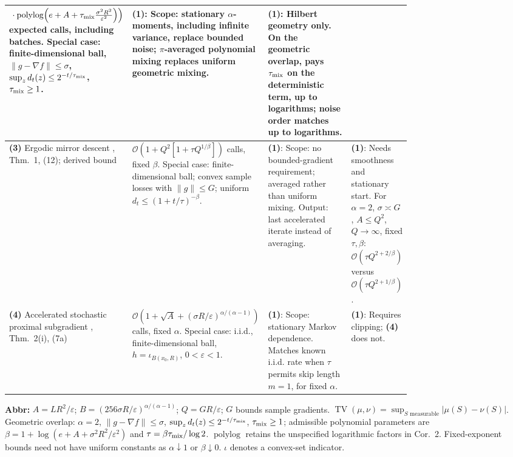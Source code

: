 \begin{table}[tp]
\begin{threeparttable}
\begin{tabularx}{\linewidth}{@{}>{\raggedright\arraybackslash}p{0.20\linewidth}>{\raggedright\arraybackslash}p{0.32\linewidth}>{\raggedright\arraybackslash}p{0.25\linewidth}>{\raggedright\arraybackslash}X@{}}
$\left.{}\cdot\operatorname{polylog}\!\left(e+A+\tau_{\rm mix}\frac{\sigma^2R^2}{\varepsilon^2}\right)\right)$ expected calls, including batches.
Special case: finite-dimensional ball, $\|g-\nabla f\|\le\sigma$, $\sup_z d_t(z)\le2^{-t/\tau_{\rm mix}}$, $\tau_{\rm mix}\ge1$.
& \textbf{(1)}: Scope: stationary $\alpha$-moments, including infinite variance, replace bounded noise; $\pi$-averaged polynomial mixing replaces uniform geometric mixing.
& \textbf{(1)}: Hilbert geometry only. On the geometric overlap, pays $\tau_{\rm mix}$ on the deterministic term, up to logarithms; noise order matches up to logarithms. \\
\midrule
\textbf{(3)} Ergodic mirror descent \citep{htmDuchi2012v3}, Thm.~1, (12); derived bound
& $\mathcal{O}\!\left(1+Q^2[1+\tau Q^{1/\beta}]\right)$ calls, fixed $\beta$.
Special case: finite-dimensional ball; convex sample losses with $\|g\|\le G$; uniform $d_t\le(1+t/\tau)^{-\beta}$.
& \textbf{(1)}: Scope: no bounded-gradient requirement; averaged rather than uniform mixing. Output: last accelerated iterate instead of averaging.
& \textbf{(1)}: Needs smoothness and stationary start. For $\alpha=2$, $\sigma\asymp G$, $A\le Q^2$, $Q\to\infty$, fixed $\tau,\beta$: $\mathcal{O}(\tau Q^{2+2/\beta})$ versus $\mathcal{O}(\tau Q^{2+1/\beta})$. \\
\midrule
\textbf{(4)} Accelerated stochastic proximal subgradient \citep{htmHeLiLu2026v2}, Thm.~2(i), (7a)
& $\mathcal{O}\!\left(1+\sqrt A+(\sigma R/\varepsilon)^{\alpha/(\alpha-1)}\right)$ calls, fixed $\alpha$.
Special case: i.i.d., finite-dimensional ball, $h=\iota_{B(x_0,R)}$, $0<\varepsilon<1$.
& \textbf{(1)}: Scope: stationary Markov dependence. Matches known i.i.d. rate when $\tau$ permits skip length $m=1$, for fixed $\alpha$.
& \textbf{(1)}: Requires clipping; \textbf{(4)} does not. \\
\bottomrule
\end{tabularx}
\begin{tablenotes}[flushleft]\footnotesize
\item[] \textbf{Abbr:} $A=LR^2/\varepsilon$; $B=(256\sigma R/\varepsilon)^{\alpha/(\alpha-1)}$; $Q=GR/\varepsilon$; $G$ bounds sample gradients. $\operatorname{TV}(\mu,\nu)=\sup_{S\text{ measurable}}|\mu(S)-\nu(S)|$. Geometric overlap: $\alpha=2$, $\|g-\nabla f\|\le\sigma$, $\sup_z d_t(z)\le2^{-t/\tau_{\rm mix}}$, $\tau_{\rm mix}\ge1$; admissible polynomial parameters are $\beta=1+\log(e+A+\sigma^2R^2/\varepsilon^2)$ and $\tau=\beta\tau_{\rm mix}/\log2$. $\operatorname{polylog}$ retains the unspecified logarithmic factors in Cor.~2. Fixed-exponent bounds need not have uniform constants as $\alpha\downarrow1$ or $\beta\downarrow0$. $\iota$ denotes a convex-set indicator.
\end{tablenotes}
\end{threeparttable}
\end{table}
\clearpage
